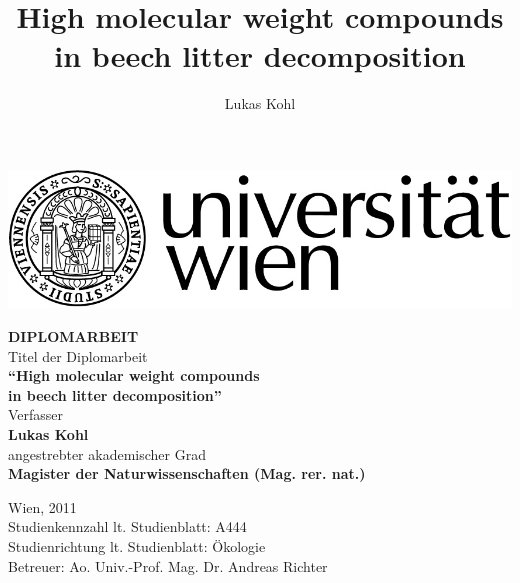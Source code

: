 \documentclass[a4paper,10pt]{book}
\title{High molecular weight compounds in beech litter decomposition}
\author{Lukas Kohl}
\begin{document}
\begin{titlepage}
\begin{flushright}
\includegraphics{RZ_Logo_Uni_sw.jpg}
\end{flushright}
\vspace{2cm}

\begin{center}
\Huge \textbf{DIPLOMARBEIT}\\
\vspace{1cm}
\normalsize Titel der Diplomarbeit\\
\large \textbf{``High molecular weight compounds \\ in beech litter decomposition''}\\
\vspace{1cm}
\normalsize Verfasser\\
\large \textbf{Lukas Kohl}\\
\vspace{1cm}
\normalsize angestrebter akademischer Grad\\
\large \textbf{Magister der Naturwissenschaften (Mag. rer. nat.)}\\
\end{center}
\vspace{3cm}

\begin{flushleft}
\normalsize Wien, 2011 \\
Studienkennzahl lt. Studienblatt: A444\\
Studienrichtung lt. Studienblatt: \"{O}kologie\\
Betreuer: Ao. Univ.-Prof. Mag. Dr. Andreas Richter\\
\end{flushleft}


\end{titlepage}

 
\newpage
% 
\tableofcontents
% 
\end{document}

